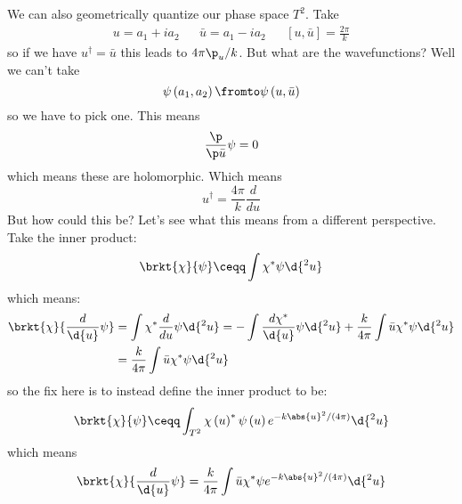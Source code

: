 \documentclass{booc}
\begin{document}
We can also geometrically quantize our phase space $T^2$.
Take
\begin{align}
u = a_1 + i a_2
&&
\bar u = a_1 - i a_2
&&
\left[ u , \bar u \right] = \frac{2\pi}{k}
\end{align}
so if we have $u^\dag = \bar u$ this leads to $4\pi \p_u / k$.
But what are the wavefunctions?
Well we can't take
\begin{equation}
\psi\left( a_1 , a_2 \right)\fromto
\psi\left( u , \bar u \right)
\end{equation}
so we have to pick one. 
This means 
\begin{equation}
\frac{\p}{\p \bar u} \psi = 0
\end{equation}
which means these are holomorphic. Which means 
\begin{equation}
u^\dag = \frac{4\pi}{k} \frac{d}{du}
\end{equation}
But how could this be? Let's see what this means from a different perspective. 
Take the inner product:
\begin{equation}
\brkt{\chi}{\psi} \ceqq \int \chi^* \psi \d{^2 u}
\end{equation}
which means:
\begin{align}
\brkt{\chi}{\frac{d}{\d{u}} \psi} &=
\int \chi^* \frac{d}{du} \psi \d{^2 u} = 
-\int \frac{d \chi^*}{\d{u}} \psi \d{^2 u} + 
\frac{k}{4\pi} \int \bar u \chi^* \psi \d{^2 u}
\\ &= 
\frac{k}{4\pi} \int \bar u \chi^* \psi \d{^2 u}
\end{align}
so the fix here is to instead define the inner product to be:
\begin{equation}
\brkt{\chi}{\psi} \ceqq \int_{T^2} \chi\left( u \right)^* \psi\left( u \right) 
e^{-k\abs{u}^2 / \left( 4\pi \right)} \d{^2 u}
\end{equation}
which means 
\begin{equation}
\brkt{\chi}{\frac{d}{\d{u}} \psi} = 
\frac{k}{4\pi} \int \bar u \chi^* \psi e^{-k\abs{u}^2 / \left( 4\pi \right)} \d{^2 u}
\end{equation}
\end{document}
